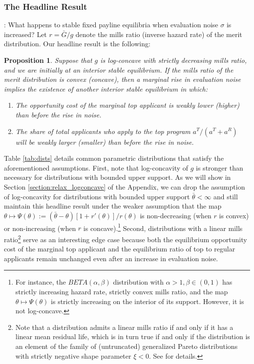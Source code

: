 \documentclass[12pt,reqno]{amsart}
\newtheorem{proposition}{Proposition}
\theoremstyle{definition}
\theoremstyle{plain} %
\begin{document}


\subsubsection{The Headline Result}: What happens to stable fixed payline equilibria when evaluation noise $\sigma$ is increased? Let $r = \bar{G}/g$ denote the mills ratio (inverse hazard rate) of the merit distribution. Our headline result is the following:
\begin{proposition}\label{prop:mainresult}
Suppose that $g$ is log-concave with strictly decreasing mills ratio, and we are initially at an interior stable equilibrium. If the mills ratio of the merit distribution is convex (concave), then a marginal rise in evaluation noise implies the existence of another interior stable equilibrium in which:
\vspace{-5pt}
\begin{enumerate}[label=(\arabic*),ref=\theproposition(\arabic*)]
   \item The opportunity cost of the marginal top applicant is weakly lower (higher) than before the rise in noise. 
   \item The share of total applicants who apply to the top program $a^T/(a^T+a^R)$ will be weakly larger (smaller) than before the rise in noise.
\end{enumerate}
\end{proposition}
\noindent Table \ref{tab:dists} details common parametric distributions that satisfy the aforementioned assumptions. First, note that log-concavity of $g$ is stronger than necessary for distributions with bounded upper support. As we will show in Section \ref{section:relax_logconcave} of the Appendix, we can drop the assumption of log-concavity for distributions with bounded upper support $\bar{\theta}<\infty$ and still maintain this headline result under the weaker assumption that the map $\theta\mapsto \Psi(\theta) := (\bar{\theta}-\theta)[1+r'(\theta)]/r(\theta)$ is non-decreasing (when $r$ is convex) or non-increasing (when $r$ is concave).\footnote{For instance, the $BETA(\alpha,\beta)$ distribution with $\alpha>1,\beta\in(0,1)$ has strictly increasing hazard rate, strictly convex mills ratio, and the map $\theta\mapsto \Psi(\theta)$ is strictly increasing on the interior of its support. However, it is not log-concave.} Second, distributions with a linear mills ratio\footnote{Note that a distribution admits a linear mills ratio if and only if it has a linear mean residual life, which is in turn true if and only if the distribution is an element of the family of (untruncated) generalized Pareto distributions with strictly negative shape parameter $\xi<0$. See \citet{hall1981mean} for details. } serve as an interesting edge case because both the equilibrium opportunity cost of the marginal top applicant and the equilibrium ratio of top to regular applicants remain unchanged even after an increase in evaluation noise.
\end{document}
